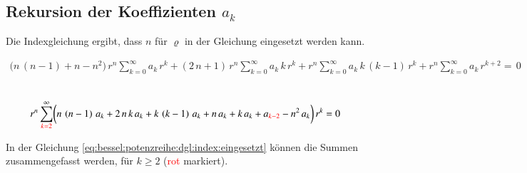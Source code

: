 
\subsection{Rekursion der Koeffizienten $a_k$}
\begin{normalsize}
	Die Indexgleichung ergibt, dass $n$ f\"ur $\varrho$ in der Gleichung  eingesetzt werden kann.
\end{normalsize}
\begin{align}
	\biggl(
	n \, \left( n - 1 \right)
	+
	n
	-
	n^2
	\biggr)
	\, r^{n}
	\sum_{k=0}^{\infty} a_k \, r^k
	+
	\left(	
	2 \, n
	+
	1
	\right)
	\, r^{n}
	\sum_{k=0}^{\infty} a_k \, k \, r^k
	+
	r^{n}
	\sum_{k=0}^{\infty} a_k \, k \, \left( k - 1 \right) \, r^k
	+
	r^{n}
	\sum_{k=0}^{\infty} a_k \, r^{k + 2}
	= \, 0
	\label{eq:bessel:potenzreihe:dgl:index:eingesetzt}
\end{align}
\\
\begin{normalsize}

\end{normalsize}
\begin{align}
	r^n
	\sum_{\textcolor{red}{k=2}}^{\infty}
	\biggl(
	n \, \left( n - 1 \right) \, a_k 
	+
	2 \, n \, k \, a_k
	+
	k \, \left( k - 1 \right) \, a_k
	+
	n \, a_k
	+
	k \, a_k
	+
	a_{\textcolor{red}{k - 2}}
	-
	n^2 \, a_k
	\biggr)
	\, r^k
	= 0 
	\label{eq:bessel:summe:zusammengefasst}
\end{align}
\begin{normalsize}
	In der Gleichung \ref{eq:bessel:potenzreihe:dgl:index:eingesetzt} k\"onnen die Summen zusammengefasst werden,
	f\"ur $k \geq 2$ (\textcolor{red}{rot} markiert).
\end{normalsize}
